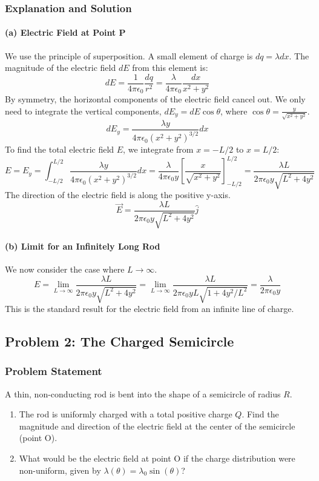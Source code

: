 \documentclass{article}
\begin{document}
\subsubsection*{Explanation and Solution}
\paragraph{(a) Electric Field at Point P}
We use the principle of superposition. A small element of charge is $dq = \lambda dx$. The magnitude of the electric field $dE$ from this element is:
$$ dE = \frac{1}{4\pi\epsilon_0} \frac{dq}{r^2} = \frac{\lambda}{4\pi\epsilon_0} \frac{dx}{x^2 + y^2} $$
By symmetry, the horizontal components of the electric field cancel out. We only need to integrate the vertical components, $dE_y = dE \cos\theta$, where $\cos\theta = \frac{y}{\sqrt{x^2 + y^2}}$.
$$ dE_y = \frac{\lambda y}{4\pi\epsilon_0(x^2 + y^2)^{3/2}} dx $$
To find the total electric field $E$, we integrate from $x = -L/2$ to $x = L/2$:
$$ E = E_y = \int_{-L/2}^{L/2} \frac{\lambda y}{4\pi\epsilon_0(x^2 + y^2)^{3/2}} dx = \frac{\lambda}{4\pi\epsilon_0 y} \left[ \frac{x}{\sqrt{x^2+y^2}} \right]_{-L/2}^{L/2} = \frac{\lambda L}{2\pi\epsilon_0 y\sqrt{L^2 + 4y^2}} $$
The direction of the electric field is along the positive y-axis.
$$ \vec{E} = \frac{\lambda L}{2\pi\epsilon_0 y\sqrt{L^2 + 4y^2}} \hat{j} $$

\paragraph{(b) Limit for an Infinitely Long Rod}
We now consider the case where $L \to \infty$.
$$ E = \lim_{L\to\infty} \frac{\lambda L}{2\pi\epsilon_0 y\sqrt{L^2 + 4y^2}} = \lim_{L\to\infty} \frac{\lambda L}{2\pi\epsilon_0 yL\sqrt{1 + 4y^2/L^2}} = \frac{\lambda}{2\pi\epsilon_0 y} $$
This is the standard result for the electric field from an infinite line of charge.

\hrulefill

\subsection{Problem 2: The Charged Semicircle}
\subsubsection*{Problem Statement}
A thin, non-conducting rod is bent into the shape of a semicircle of radius $R$.
\begin{enumerate}
    \item[(a)] The rod is uniformly charged with a total positive charge $Q$. Find the magnitude and direction of the electric field at the center of the semicircle (point O).
    \item[(b)] What would be the electric field at point O if the charge distribution were non-uniform, given by $\lambda(\theta) = \lambda_0 \sin(\theta)$?
\end{enumerate}
\end{document}
